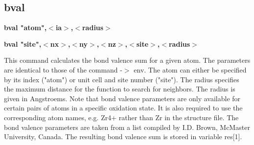 \subsection*{bval}
{\bf bval "atom",$ <$ia$> $,$ <$radius$> $ \par }
{\bf bval "site",$ <$nx$> $,$ <$ny$> $,$ <$nz$> $,$ <$site$> $,$ <$radius$> $ \par }
\par
\vspace{3pt}
This command calculates the bond valence sum for a given atom. The 
parameters are identical to those of the command -$> $ env. The atom 
can either be specified by its index ("atom") or unit cell and 
site number ("site"). The radius specifies the maximum distance 
for the function to search for neighbors. The radius is given in 
Angstroems. Note that bond valence parameters are only available 
for certain pairs of atoms in a specific oxidation state. It is 
also required to use the corresponding atom names, e.g. Zr4+ rather 
than Zr in the structure file. The bond valence parameters are 
taken from a list compiled by I.D. Brown, McMaster University, Canada. 
The resulting bond valence sum is stored in variable res[1]. 
